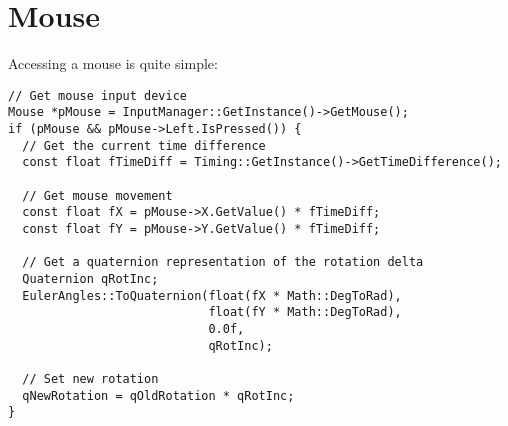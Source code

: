 \chapter{Mouse}
Accessing a mouse is quite simple:

\begin{lstlisting}[caption=Mouse usage example]
// Get mouse input device
Mouse *pMouse = InputManager::GetInstance()->GetMouse();
if (pMouse && pMouse->Left.IsPressed()) {
  // Get the current time difference
  const float fTimeDiff = Timing::GetInstance()->GetTimeDifference();

  // Get mouse movement
  const float fX = pMouse->X.GetValue() * fTimeDiff;
  const float fY = pMouse->Y.GetValue() * fTimeDiff;

  // Get a quaternion representation of the rotation delta
  Quaternion qRotInc;
  EulerAngles::ToQuaternion(float(fX * Math::DegToRad),
                            float(fY * Math::DegToRad),
                            0.0f,
                            qRotInc);

  // Set new rotation
  qNewRotation = qOldRotation * qRotInc;
}
\end{lstlisting}
